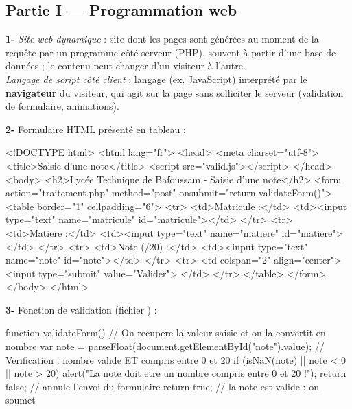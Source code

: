 
\subsection*{Partie I — Programmation web}


\textbf{1-} \emph{Site web dynamique} : site dont les pages sont générées au moment
de la requête par un programme côté serveur (PHP), souvent à partir d'une base de
données ; le contenu peut changer d'un visiteur à l'autre.\\
\emph{Langage de script côté client} : langage (ex. JavaScript) interprété par le
\textbf{navigateur} du visiteur, qui agit sur la page sans solliciter le serveur
(validation de formulaire, animations).

\smallskip
\textbf{2-} Formulaire HTML présenté en tableau :
\begin{codehtml}
<!DOCTYPE html>
<html lang="fr">
<head>
  <meta charset="utf-8">
  <title>Saisie d'une note</title>
  <script src="valid.js"></script>
</head>
<body>
  <h2>Lycée Technique de Bafoussam - Saisie d'une note</h2>
  <form action="traitement.php" method="post" onsubmit="return validateForm()">
    <table border="1" cellpadding="6">
      <tr>
        <td>Matricule :</td>
        <td><input type="text" name="matricule" id="matricule"></td>
      </tr>
      <tr>
        <td>Matiere :</td>
        <td><input type="text" name="matiere" id="matiere"></td>
      </tr>
      <tr>
        <td>Note (/20) :</td>
        <td><input type="text" name="note" id="note"></td>
      </tr>
      <tr>
        <td colspan="2" align="center">
          <input type="submit" value="Valider">
        </td>
      </tr>
    </table>
  </form>
</body>
</html>
\end{codehtml}

\textbf{3-} Fonction de validation (fichier ) :
\begin{codejs}
function validateForm() {
  // On recupere la valeur saisie et on la convertit en nombre
  var note = parseFloat(document.getElementById("note").value);
  // Verification : nombre valide ET compris entre 0 et 20
  if (isNaN(note) || note < 0 || note > 20) {
    alert("La note doit etre un nombre compris entre 0 et 20 !");
    return false;   // annule l'envoi du formulaire
  }
  return true;      // la note est valide : on soumet
}
\end{codejs}

